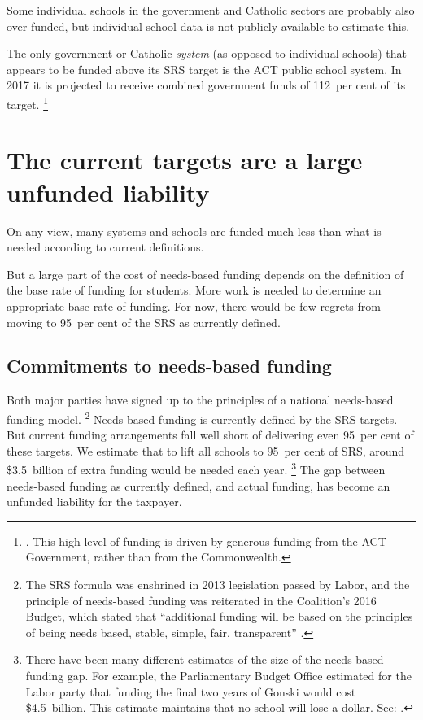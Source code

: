 \documentclass{grattan}
\begin{document}
Some individual schools in the government and Catholic sectors are probably also over-funded, but individual school data is not publicly available to estimate this.

The only government or Catholic \emph{system} (as opposed to individual schools) that appears to be funded above its SRS target is the ACT public school system.
In 2017 it is projected to receive combined government funds of 112~per cent of its target.%
\footnote{\textcite{SenateSQ15000244}.
This high level of funding is driven by generous funding from the ACT Government, rather than from the Commonwealth.}

\section{The current targets are a large unfunded liability}\label{sec:needs-based-funding-is-now-a-large-unfunded-liability}

On any view, many systems and schools are funded much less than what is needed according to current definitions.

But a large part of the cost of needs-based funding depends on the definition of the base rate of funding for students.
More work is needed to determine an appropriate base rate of funding.
For now, there would be few regrets from moving to 95~per cent of the SRS as currently defined.

\subsection{Commitments to needs-based funding}\label{subsec:commitments-to-needs-based-funding}

Both major parties have signed up to the principles of a national needs-based funding model.%
\footnote{The SRS formula was enshrined in 2013 legislation passed by Labor, and the principle of needs-based funding was reiterated in the Coalition's 2016 Budget, which stated that ``additional funding will be based on the principles of being needs based, stable, simple, fair, transparent'' {\textcite[][No.~2, p.~80]{Treasury2016BudgetPapers2016}}.}
Needs-based funding is currently defined by the SRS targets. But current funding arrangements fall well short of delivering even 95~per cent of these targets. We estimate that to lift all schools to 95~per cent of SRS, around \$3.5~billion of extra funding would be needed each year.%
\footnote{There have been many different estimates of the size of the needs-based funding gap. For example, the Parliamentary Budget Office estimated for the Labor party that funding the final two years of Gonski would cost \$4.5~billion.
This estimate maintains that no school will lose a dollar. See:
\textcite{PBO2016PostElectionReport}.}
The gap between needs-based funding as currently defined, and actual funding, has become an unfunded liability for the taxpayer.
\end{document}
